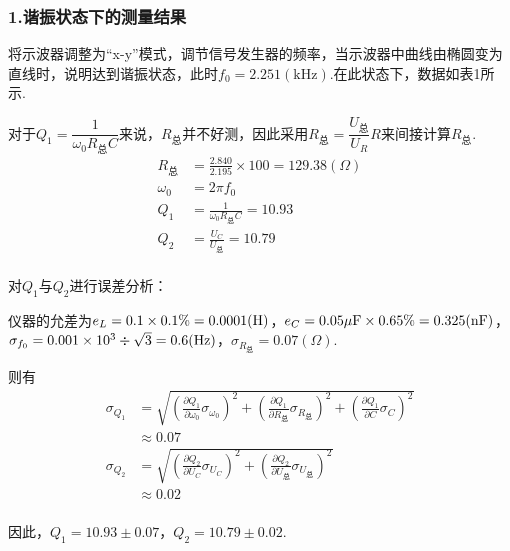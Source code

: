 \documentclass[12pt,a4paper,UTF8]{ctexart}
\begin{document}
\subsubsection*{1.谐振状态下的测量结果}
将示波器调整为“x-y”模式，调节信号发生器的频率，当示波器中曲线由椭圆变为直线时，说明达到谐振状态，此时$f_0=2.251(\mathrm{kHz})$.在此状态下，数据如表1所示.
\begin{table}[htbp]
\centering
\caption{谐振状态下的测量结果}
\end{table}\par
对于$Q_1=\dfrac{1}{\omega_0R_{\text{总}}C}$来说，$R_{\text{总}}$并不好测，因此采用$R_{\text{总}}=\dfrac{U_{\text{总}}}{U_R}R$来间接计算$R_{\text{总}}$.
\begin{align*}
	R_{\text{总}}&=\frac{2.840}{2.195}\times100=129.38(\Omega) \\
	\omega_0&=2\pi f_0 \\
	Q_1&=\frac{1}{\omega_0R_{\text{总}}C}=10.93 \\
	Q_2&=\frac{U_C}{U_{\text{总}}}=10.79 \\
\end{align*}
\par
对$Q_1$与$Q_2$进行误差分析：\par
仪器的允差为$e_L=0.1\times0.1\%=0.0001(\rm{H})$，$e_C=0.05\rm{\mu F}\times0.65\%=0.325(\rm{nF})$，$\sigma_{f_0}=0.001\times10^3\div\sqrt{3}=0.6(\rm{Hz})$，$\sigma_{R_{\text{总}}}=0.07(\Omega)$.\par
则有
\begin{align*}
	\sigma_{Q_1}&=\sqrt{(\frac{\partial Q_1}{\partial \omega_0}\sigma_{\omega_0})^2+(\frac{\partial Q_1}{\partial R_{\text{总}}}\sigma_{R_{\text{总}}})^2+(\frac{\partial Q_1}{\partial C}\sigma_C)^2} \\
	&\approx0.07 \\
	\sigma_{Q_2}&=\sqrt{(\frac{\partial Q_2}{\partial U_C}\sigma_{U_C})^2+(\frac{\partial Q_2}{\partial U_{\text{总}}}\sigma_{U_{\text{总}}})^2} \\
	&\approx0.02 \\
\end{align*}
\par
因此，$Q_1=10.93\pm0.07$，$Q_2=10.79\pm0.02$.
\end{document}
